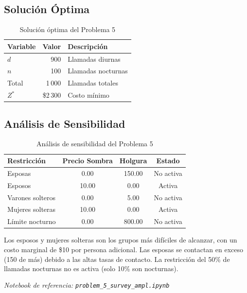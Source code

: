 \documentclass[12pt,a4paper]{article}
\begin{document}
\subsection{Solución Óptima}

\begin{table}[h]
\centering
\begin{tabular}{lrl}
\toprule
\textbf{Variable} & \textbf{Valor} & \textbf{Descripción} \\
\midrule
$d$ & 900 & Llamadas diurnas \\
$n$ & 100 & Llamadas nocturnas \\
Total & 1\,000 & Llamadas totales \\
$Z^*$ & \$2\,300 & Costo mínimo \\
\bottomrule
\end{tabular}
\caption{Solución óptima del Problema 5}
\end{table}

\subsection{Análisis de Sensibilidad}

\begin{table}[h]
\centering
\begin{tabular}{lccc}
\toprule
\textbf{Restricción} & \textbf{Precio Sombra} & \textbf{Holgura} & \textbf{Estado} \\
\midrule
Esposas & 0.00 & 150.00 & No activa \\
Esposos & 10.00 & 0.00 & Activa \\
Varones solteros & 0.00 & 5.00 & No activa \\
Mujeres solteras & 10.00 & 0.00 & Activa \\
Límite nocturno & 0.00 & 800.00 & No activa \\
\bottomrule
\end{tabular}
\caption{Análisis de sensibilidad del Problema 5}
\end{table}

Los esposos y mujeres solteras son los grupos más difíciles de alcanzar, con un costo marginal de \$10 por persona adicional. Las esposas se contactan en exceso (150 de más) debido a las altas tasas de contacto. La restricción del 50\% de llamadas nocturnas no es activa (solo 10\% son nocturnas).

\textit{Notebook de referencia: \texttt{problem\_5\_survey\_ampl.ipynb}}

\newpage
\end{document}
